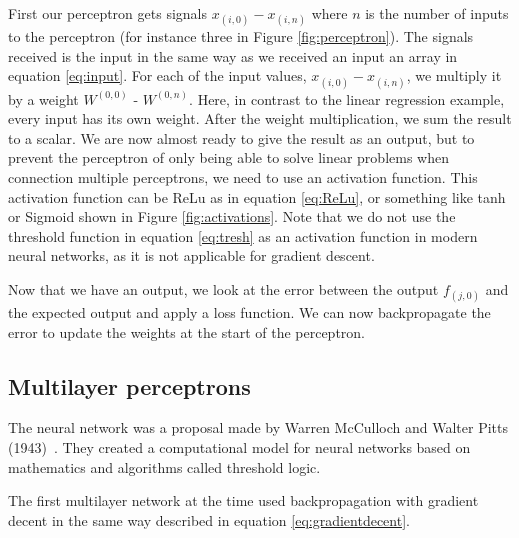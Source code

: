 First our perceptron gets signals $x_{(i,0)}-x_{(i,n)}$ where $n$ is the number of inputs to the perceptron (for instance three in Figure \ref{fig:perceptron}). The signals received is the input in the same way as we received an input an array in equation \ref{eq:input}.
For each of the input values, $x_{(i,0)}-x_{(i,n)}$, we multiply it by a weight $W^{(0,0)}$ -  $W^{(0,n)}$. Here, in contrast to the linear regression example, every input has its own weight.
After the weight multiplication, we sum the result to a scalar.
We are now almost ready to give the result as an output, but to prevent the perceptron of only being able to solve linear problems when connection multiple perceptrons, we need to use an activation function. This activation function can be ReLu as in equation \ref{eq:ReLu}, or something like tanh or Sigmoid shown in Figure \ref{fig:activations}. Note that we do not use the threshold function in equation \ref{eq:tresh} as an activation function in modern neural networks, as it is not applicable for gradient descent.

Now that we have an output, we look at the error between the output $f_{(j,0)}$ and the expected output and apply a loss function. We can now backpropagate the error to update the weights at the start of the perceptron.


\subsection{Multilayer perceptrons}
\label{cha:MLP}
The neural network was a proposal made by Warren McCulloch and Walter Pitts (1943)~\cite{roweis2000nonlinear}. They created a computational model for neural networks based on mathematics and algorithms called threshold logic. 

The first multilayer network at the time used backpropagation with gradient decent in the same way described in equation \ref{eq:gradientdecent}.


